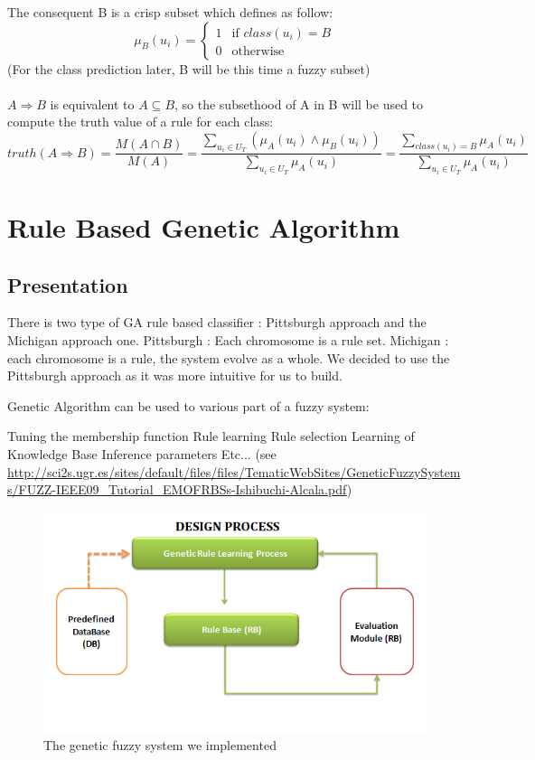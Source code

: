 \documentclass[a4paper,12pt]{article}
\begin{document}
The consequent B is a crisp subset which defines as follow:
\[\mu_B(u_i)=
\begin{cases}
	1 & \text{if $class(u_i)=B$}\\
	0 & \text{otherwise}
\end{cases}\]
(For the class prediction later, B will be this time a fuzzy subset)\\
\\
$A\Rightarrow B$ is equivalent to $A\subseteq B$, so the subsethood of A in B will be used to compute the truth value of a rule for each class:
\[
	truth(A\Rightarrow B)=
	\frac{M(A\cap B)}{M(A)}=
	\frac
		{\sum\limits_{u_i\in U_T}{(\mu_A(u_i)\land \mu_B(u_i))}}
		{\sum\limits_{u_i\in U_T}{\mu_A(u_i)}}=
	\frac
		{\sum\limits_{class(u_i)=B}{\mu_A(u_i)}}
		{\sum\limits_{u_i\in U_T}{\mu_A(u_i)}}
\]

\newpage

\section{Rule Based Genetic Algorithm}

\subsection{Presentation}

There is two type of GA rule based classifier : Pittsburgh approach and the Michigan approach one. Pittsburgh : Each chromosome is a rule set. Michigan : each chromosome is a rule, the system evolve as a whole. We decided to use the Pittsburgh approach as it was more intuitive for us to build.


Genetic Algorithm can be used to various part of a fuzzy system:

Tuning the membership function
Rule learning
Rule selection
Learning of Knowledge Base
Inference parameters
Etc... (see \url{http://sci2s.ugr.es/sites/default/files/files/TematicWebSites/GeneticFuzzySystems/FUZZ-IEEE09_Tutorial_EMOFRBSs-Ishibuchi-Alcala.pdf})

\begin{figure}
\centering
\caption{The genetic fuzzy system we implemented}
\includegraphics[scale=0.5]{genefuzzy}
\end{figure}
\end{document}

